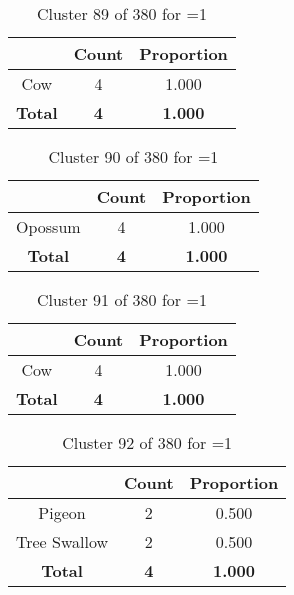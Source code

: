 \begin{table}[ht!]
\centering
\begin{tabular}{|c|c|c|}
\hline
\bf \Spec{} &\bf Count &\bf Proportion\\ \hline \hline
Cow & 4 & 1.000\\ \hline
\hline
\bf Total & \bf 4 & \bf 1.000\\ \hline
\end{tabular}
\label{tab:cluster:89:1}
\caption{Cluster 89 of 380 for \minneigh{}=1}
\end{table}

\clearpage
\begin{table}[ht!]
\centering
\begin{tabular}{|c|c|c|}
\hline
\bf \Spec{} &\bf Count &\bf Proportion\\ \hline \hline
Opossum & 4 & 1.000\\ \hline
\hline
\bf Total & \bf 4 & \bf 1.000\\ \hline
\end{tabular}
\label{tab:cluster:90:1}
\caption{Cluster 90 of 380 for \minneigh{}=1}
\end{table}

\begin{table}[ht!]
\centering
\begin{tabular}{|c|c|c|}
\hline
\bf \Spec{} &\bf Count &\bf Proportion\\ \hline \hline
Cow & 4 & 1.000\\ \hline
\hline
\bf Total & \bf 4 & \bf 1.000\\ \hline
\end{tabular}
\label{tab:cluster:91:1}
\caption{Cluster 91 of 380 for \minneigh{}=1}
\end{table}

\begin{table}[ht!]
\centering
\begin{tabular}{|c|c|c|}
\hline
\bf \Spec{} &\bf Count &\bf Proportion\\ \hline \hline
Pigeon & 2 & 0.500\\ \hline
Tree Swallow & 2 & 0.500\\ \hline
\hline
\bf Total & \bf 4 & \bf 1.000\\ \hline
\end{tabular}
\label{tab:cluster:92:1}
\caption{Cluster 92 of 380 for \minneigh{}=1}
\end{table}

